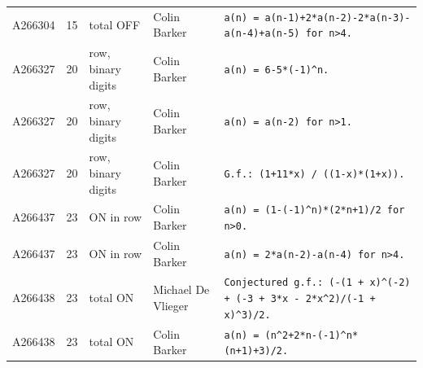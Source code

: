 \documentclass[11pt]{article}
\theoremstyle{definition}
\theoremstyle{remark}
\begin{document}
{\begin{longtable}{p{1.3cm}p{0.7cm}p{2.4cm}p{2.3cm}p{7.3cm}}
A266304 & 15 & total OFF & Colin Barker & \texttt{a(n)\allowbreak{} \allowbreak{}=\allowbreak{} \allowbreak{}a(n-\allowbreak{}1)\allowbreak{}+\allowbreak{}2*\allowbreak{}a(n-\allowbreak{}2)\allowbreak{}-\allowbreak{}2*\allowbreak{}a(n-\allowbreak{}3)\allowbreak{}-\allowbreak{}a(n-\allowbreak{}4)\allowbreak{}+\allowbreak{}a(n-\allowbreak{}5)\allowbreak{} \allowbreak{}for \allowbreak{}n>4.} \\
A266327 & 20 & row, binary digits & Colin Barker & \texttt{a(n)\allowbreak{} \allowbreak{}=\allowbreak{} \allowbreak{}6-\allowbreak{}5*\allowbreak{}(-\allowbreak{}1)\allowbreak{}\^{}n.} \\
A266327 & 20 & row, binary digits & Colin Barker & \texttt{a(n)\allowbreak{} \allowbreak{}=\allowbreak{} \allowbreak{}a(n-\allowbreak{}2)\allowbreak{} \allowbreak{}for \allowbreak{}n>1.} \\
A266327 & 20 & row, binary digits & Colin Barker & \texttt{G.f.: \allowbreak{}(1+\allowbreak{}11*\allowbreak{}x)\allowbreak{} \allowbreak{}/\allowbreak{} \allowbreak{}((1-\allowbreak{}x)\allowbreak{}*\allowbreak{}(1+\allowbreak{}x)\allowbreak{})\allowbreak{}.} \\
A266437 & 23 & ON in row & Colin Barker & \texttt{a(n)\allowbreak{} \allowbreak{}=\allowbreak{} \allowbreak{}(1-\allowbreak{}(-\allowbreak{}1)\allowbreak{}\^{}n)\allowbreak{}*\allowbreak{}(2*\allowbreak{}n+\allowbreak{}1)\allowbreak{}/\allowbreak{}2 \allowbreak{}for \allowbreak{}n>0.} \\
A266437 & 23 & ON in row & Colin Barker & \texttt{a(n)\allowbreak{} \allowbreak{}=\allowbreak{} \allowbreak{}2*\allowbreak{}a(n-\allowbreak{}2)\allowbreak{}-\allowbreak{}a(n-\allowbreak{}4)\allowbreak{} \allowbreak{}for \allowbreak{}n>4.} \\
A266438 & 23 & total ON & Michael De Vlieger & \texttt{Conjectured \allowbreak{}g.f.: \allowbreak{}(-\allowbreak{}(1 \allowbreak{}+\allowbreak{} \allowbreak{}x)\allowbreak{}\^{}(-\allowbreak{}2)\allowbreak{} \allowbreak{}+\allowbreak{} \allowbreak{}(-\allowbreak{}3 \allowbreak{}+\allowbreak{} \allowbreak{}3*\allowbreak{}x \allowbreak{}-\allowbreak{} \allowbreak{}2*\allowbreak{}x\^{}2)\allowbreak{}/\allowbreak{}(-\allowbreak{}1 \allowbreak{}+\allowbreak{} \allowbreak{}x)\allowbreak{}\^{}3)\allowbreak{}/\allowbreak{}2.} \\
A266438 & 23 & total ON & Colin Barker & \texttt{a(n)\allowbreak{} \allowbreak{}=\allowbreak{} \allowbreak{}(n\^{}2+\allowbreak{}2*\allowbreak{}n-\allowbreak{}(-\allowbreak{}1)\allowbreak{}\^{}n*\allowbreak{}(n+\allowbreak{}1)\allowbreak{}+\allowbreak{}3)\allowbreak{}/\allowbreak{}2.} \\

\end{longtable}}
\end{document}
